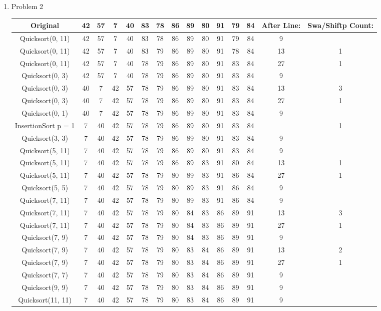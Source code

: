 \documentclass[11pt]{article}
\begin{document}
\begin{enumerate}
\item Problem 2\\
\begin{center}
\begin{tabular}{c|cccccccccccc|cc}
Original & 42& 57& 7& 40& 83& 78& 86& 89& 80& 91& 79& 84 & After Line:& Swa/Shiftp Count:\\\hline
Quicksort(0, 11)&42& 57& 7& 40& 83& 78& 86& 89& 80& 91& 79& 84&9\\
Quicksort(0, 11)&42& 57& 7& 40& 83& 79& 86& 89& 80& 91& 78& 84&13&1\\
Quicksort(0, 11)&42& 57& 7& 40& 78& 79& 86& 89& 80& 91& 83& 84&27&1\\
Quicksort(0, 3)&42& 57& 7& 40& 78& 79& 86& 89& 80& 91& 83& 84&9\\
Quicksort(0, 3)&40& 7& 42& 57& 78& 79& 86& 89& 80& 91& 83& 84&13&3\\
Quicksort(0, 3)&40& 7& 42& 57& 78& 79& 86& 89& 80& 91& 83& 84&27&1\\
Quicksort(0, 1)&40& 7& 42& 57& 78& 79& 86& 89& 80& 91& 83& 84&9\\
InsertionSort p = 1 &7& 40& 42& 57& 78& 79& 86& 89& 80& 91& 83& 84&&1\\
Quicksort(3, 3)&7& 40& 42& 57& 78& 79& 86& 89& 80& 91& 83& 84&9\\
Quicksort(5, 11)&7& 40& 42& 57& 78& 79& 86& 89& 80& 91& 83& 84&9\\
Quicksort(5, 11)&7& 40& 42& 57& 78& 79& 86& 89& 83& 91& 80& 84&13&1\\
Quicksort(5, 11)&7& 40& 42& 57& 78& 79& 80& 89& 83& 91& 86& 84&27&1\\
Quicksort(5, 5)&7& 40& 42& 57& 78& 79& 80& 89& 83& 91& 86& 84&9\\
Quicksort(7, 11)&7& 40& 42& 57& 78& 79& 80& 89& 83& 91& 86& 84&9\\
Quicksort(7, 11)&7& 40& 42& 57& 78& 79& 80& 84& 83& 86& 89& 91&13&3\\
Quicksort(7, 11)&7& 40& 42& 57& 78& 79& 80& 84& 83& 86& 89& 91&27&1\\
Quicksort(7, 9)&7& 40& 42& 57& 78& 79& 80& 84& 83& 86& 89& 91&9\\
Quicksort(7, 9)&7& 40& 42& 57& 78& 79& 80& 83& 84& 86& 89& 91&13&2\\
Quicksort(7, 9)&7& 40& 42& 57& 78& 79& 80& 83& 84& 86& 89& 91&27&1\\
Quicksort(7, 7)&7& 40& 42& 57& 78& 79& 80& 83& 84& 86& 89& 91&9\\
Quicksort(9, 9)&7& 40& 42& 57& 78& 79& 80& 83& 84& 86& 89& 91&9\\
Quicksort(11, 11)&7& 40& 42& 57& 78& 79& 80& 83& 84& 86& 89& 91&9


\end{tabular}
\end{center}
\end{enumerate}
\end{document}
